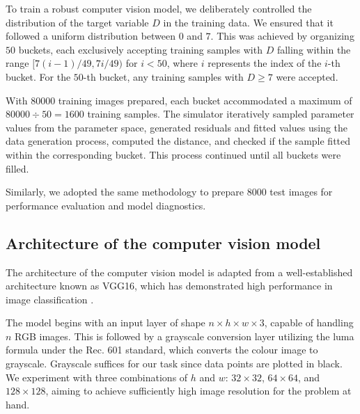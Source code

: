 \documentclass[]{interact}
\theoremstyle{plain}%
\theoremstyle{definition}
\theoremstyle{remark}
\begin{document}
To train a robust computer vision model, we deliberately controlled the
distribution of the target variable \(D\) in the training data. We
ensured that it followed a uniform distribution between \(0\) and \(7\).
This was achieved by organizing \(50\) buckets, each exclusively
accepting training samples with \(D\) falling within the range
\([7(i - 1)/49, 7i/49)\) for \(i < 50\), where \(i\) represents the
index of the \(i\)-th bucket. For the \(50\)-th bucket, any training
samples with \(D \geq 7\) were accepted.

With 80000 training images prepared, each bucket accommodated a maximum
of \(80000 \div 50 = 1600\) training samples. The simulator iteratively
sampled parameter values from the parameter space, generated residuals
and fitted values using the data generation process, computed the
distance, and checked if the sample fitted within the corresponding
bucket. This process continued until all buckets were filled.

Similarly, we adopted the same methodology to prepare 8000 test images
for performance evaluation and model diagnostics.

\subsection{Architecture of the computer vision
model}\label{architecture-of-the-computer-vision-model}

The architecture of the computer vision model is adapted from a
well-established architecture known as VGG16, which has demonstrated
high performance in image classification \citep{simonyan2014very}.

The model begins with an input layer of shape
\(n \times h \times w \times 3\), capable of handling \(n\) RGB images.
This is followed by a grayscale conversion layer utilizing the luma
formula under the Rec. 601 standard, which converts the colour image to
grayscale. Grayscale suffices for our task since data points are plotted
in black. We experiment with three combinations of \(h\) and \(w\):
\(32 \times 32\), \(64 \times 64\), and \(128 \times 128\), aiming to
achieve sufficiently high image resolution for the problem at hand.
\end{document}
